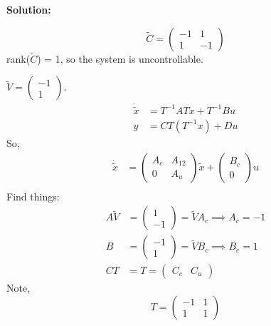 \documentclass[12pt]{article}
\newenvironment{solution}{
    \textbf{Solution:}
    
}{
    
    \vspace{2em}
}
\begin{document}
\begin{solution}
    \[
        \tilde{C} = \begin{pmatrix}
            -1 & 1\\
            1 & -1
        \end{pmatrix}
    \]
    rank(\(\tilde{C}\)) = 1, so the system is uncontrollable.

    \(\tilde{V} = \begin{pmatrix}
        -1\\
        1
    \end{pmatrix}\).
    \[
        \begin{aligned}
            \dot{\tilde{x}} &= T^{-1}ATx + T^{-1}Bu\\
            y &= CT(T^{-1}x) + Du
        \end{aligned}
    \]
    So,
    \[
        \begin{aligned}
            \dot{\tilde{x}} &= \begin{pmatrix}
                A_c & A_{12}\\
                0 & A_u
            \end{pmatrix} \tilde{x} + \begin{pmatrix}
                B_c\\
                0
            \end{pmatrix} u\\
        \end{aligned}
    \]
    Find things:
    \[
        \begin{aligned}
            A\tilde{V} &= \begin{pmatrix}
                1\\
                -1
            \end{pmatrix} = \tilde{V} A_c \implies A_c = -1\\
            B &= \begin{pmatrix}
                -1\\
                1
            \end{pmatrix} = \tilde{V} B_c \implies B_c = 1\\
            CT &= T = \begin{pmatrix}
                C_c & C_u
            \end{pmatrix}
        \end{aligned}
    \]
    Note,
    \[
        T = \begin{pmatrix}
            -1 & 1\\
            1 & 1
        \end{pmatrix}
\]
\end{solution}
\end{document}
